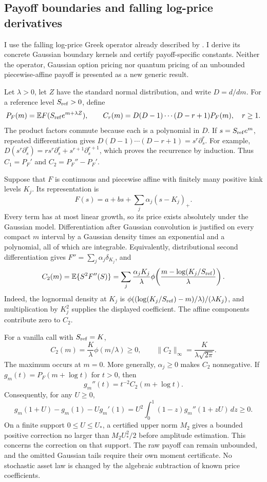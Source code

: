 \subsection{Payoff boundaries and falling log-price derivatives}
\label{sec:payoff-boundary-derivatives}

I use the falling log-price Greek operator already described by
\citet{carr2001}. I derive its concrete Gaussian boundary kernels and certify
payoff-specific constants. Neither the operator, Gaussian option pricing nor
quantum pricing of an unbounded piecewise-affine payoff is presented as a
new generic result.

Let $\lambda>0$, let $Z$ have the standard normal distribution, and write
$D=d/dm$. For a reference level $S_{\rm ref}>0$, define
\[
 P_F(m)=\mathbb E F(S_{\rm ref}e^{m+\lambda Z}),\qquad
 C_r(m)=D(D-1)\cdots(D-r+1)P_F(m),\quad r\geq1.
\]
The product factors commute because each is a polynomial in $D$.
If $s=S_{\rm ref}e^m$, repeated differentiation gives
$D(D-1)\cdots(D-r+1)=s^r\partial_s^r$. For example,
$D(s^r\partial_s^r)=r s^r\partial_s^r+s^{r+1}\partial_s^{r+1}$,
which proves the recurrence by induction. Thus $C_1=P_F'$ and
$C_2=P_F''-P_F'$.

Suppose that $F$ is continuous and piecewise affine with finitely many
positive kink levels $K_j$. Its representation is
\[
 F(s)=a+bs+\sum_j\alpha_j(s-K_j)_+.
\]
Every term has at most linear growth, so its price exists absolutely under
the Gaussian model. Differentiation after Gaussian convolution is justified
on every compact $m$ interval by a Gaussian density times an exponential
and a polynomial, all of which are integrable. Equivalently, distributional
second differentiation gives $F''=\sum_j\alpha_j\delta_{K_j}$, and
\[
 C_2(m)=\mathbb E\{S^2F''(S)\}
 =\sum_j\frac{\alpha_jK_j}{\lambda}
       \phi\!\left(\frac{m-\log(K_j/S_{\rm ref})}{\lambda}\right).
\]
Indeed, the lognormal density at $K_j$ is
$\phi((\log(K_j/S_{\rm ref})-m)/\lambda)/(\lambda K_j)$,
and multiplication by $K_j^2$ supplies the displayed coefficient.
The affine components contribute zero to $C_2$.

For a vanilla call with $S_{\rm ref}=K$,
\[
 C_2(m)=\frac K\lambda\phi(m/\lambda)\geq0,
 \qquad \|C_2\|_\infty=\frac K{\lambda\sqrt{2\pi}}.
\]
The maximum occurs at $m=0$. More generally, $\alpha_j\geq0$ makes $C_2$
nonnegative. If $g_m(t)=P_F(m+\log t)$ for $t>0$, then
\[
 g_m''(t)=t^{-2}C_2(m+\log t).
\]
Consequently, for any $U\geq0$,
\[
 g_m(1+U)-g_m(1)-Ug_m'(1)
 =U^2\int_0^1(1-z)g_m''(1+zU)\,dz\geq0.
\]
On a finite support $0\leq U\leq U_*$, a certified upper norm $M_2$
gives a bounded positive correction no larger than $M_2U_*^2/2$ before
amplitude estimation. This concerns the correction on that support. The
raw payoff can remain unbounded, and the omitted Gaussian tails require
their own moment certificate. No stochastic asset law is changed by the
algebraic subtraction of known price coefficients.

